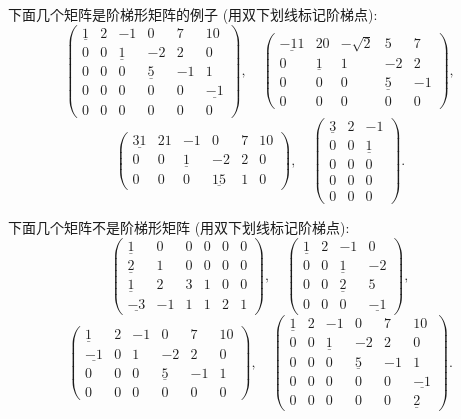\documentclass[UTF8, 12pt, fontset=fandol, oneside]{ctexart}
\begin{document}
下面几个矩阵是阶梯形矩阵的例子 (用双下划线标记阶梯点):
\[
\left(\begin{array}{cccccc}
\underline{1} & 2 & -1 & 0 & 7 & 10\\
0 & 0 & \underline{1} & -2 & 2 & 0\\
0 & 0 & 0 & \underline{5} & -1 & 1\\
0 & 0 & 0 & 0 & 0 & \underline{-1}\\
0 & 0 & 0 & 0 & 0 & 0
\end{array}\right),\quad
\left(\begin{array}{ccccc}
\underline{-11} & 20 & -\sqrt{2} & 5 & 7\\
0 & \underline{1} & 1 & -2 & 2\\
0 & 0 & 0 & \underline{5} & -1\\
0 & 0 & 0 & 0 & 0
\end{array}\right),
\]
\[
\left(\begin{array}{cccccc}
\underline{31} & 21 & -1 & 0 & 7 & 10\\
0 & 0 & \underline{1} & -2 & 2 & 0\\
0 & 0 & 0 & \underline{15} & 1 & 0
\end{array}\right),\quad
\left(\begin{array}{ccc}
\underline{3} & 2 & -1\\
0 & 0 & \underline{1}\\
0 & 0 & 0\\
0 & 0 & 0\\
0 & 0 & 0
\end{array}\right).
\]

下面几个矩阵不是阶梯形矩阵 (用双下划线标记阶梯点):
\[
\left(\begin{array}{cccccc}
\underline{1} & 0 & 0 & 0 & 0 & 0\\
\underline{2} & 1 & 0 & 0 & 0 & 0\\
\underline{1} & 2 & 3 & 1 & 0 & 0\\
\underline{-3} & -1 & 1 & 1 & 2 & 1
\end{array}\right),\quad
\left(\begin{array}{cccc}
\underline{1} & 2 & -1 & 0\\
0 & 0 & \underline{1} & -2\\
0 & 0 & \underline{2} & 5\\
0 & 0 & 0 & \underline{-1}
\end{array}\right),
\]
\[
\left(\begin{array}{cccccc}
\underline{1} & 2 & -1 & 0 & 7 & 10\\
\underline{-1} & 0 & 1 & -2 & 2 & 0\\
0 & 0 & 0 & \underline{5} & -1 & 1\\
0 & 0 & 0 & 0 & 0 & 0
\end{array}\right),\quad
\left(\begin{array}{cccccc}
\underline{1} & 2 & -1 & 0 & 7 & 10\\
0 & 0 & \underline{1} & -2 & 2 & 0\\
0 & 0 & 0 & \underline{5} & -1 & 1\\
0 & 0 & 0 & 0 & 0 & \underline{-1}\\
0 & 0 & 0 & 0 & 0 & \underline{2}
\end{array}\right).
\]
\end{document}
